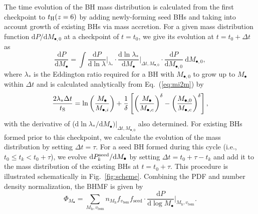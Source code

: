\documentclass[twocolumn, twocolappendix]{aastex63}
\newcommand{\Mh}{M_\mathrm{h}}
\newcommand{\Mbh}{M_\bullet}
\newcommand{\vbsm}{v_\mathrm{bsm}}
\newcommand{\tlife}{\tau}
\newcommand{\fseed}{f_\mathrm{seed}}
\newcommand{\D}{\mathrm{d}}
\begin{document}
\begin{CJK*}{UTF8}{gbsn}
The time evolution of the BH mass distribution is calculated from the first checkpoint to $t_{\rm H}(z=6)$ by adding newly-forming seed BHs
and taking into account growth of existing BHs via mass accretion.
For a given mass distribution function $\D P/\D  M_{\bullet, 0}$ at a checkpoint of $t=t_0$, 
we give its evolution at $t=t_0+\Delta t$ as
\begin{equation}
  \label{eq:dpdm}
  \frac{\D P}{\D \Mbh} = \int
   \frac{\D P}{\D \ln \lambda}\Big|_{\lambda_\ast} \cdot
   \frac{\D \ln \lambda_\ast}{\D  \Mbh}\Big|_{\Delta t, M_{\bullet,0}} \cdot
  \frac{\D P}{\D M_{\bullet, 0}}~\D M_{\bullet, 0},
\end{equation}
%
where $\lambda_\ast$ is the Eddington ratio required for a BH with $M_{\bullet,0}$ to grow up to $\Mbh$ within $\Delta t$
and is calculated analytically from Eq.~(\ref{eq:mi2m}) by
\begin{equation}
  \label{eq:mi2m}
\frac{2 \lambda_\ast \Delta t}{t_{\rm S}}=
  \ln \left(\frac{\Mbh} {M_{\bullet,i}}\right) + \frac{1}{\delta} 
  \left[ \left(\frac{\Mbh}{M_{\bullet,c}}\right)^\delta - \left(\frac{M_{\bullet, 0}}{M_{\bullet,c}}\right)^\delta \right],
\end{equation}
%
with the derivative of ($\D \ln \lambda_\ast / \D  \Mbh )|_{\Delta t, M_{\bullet,0}}$ also determined.
For existing BHs formed prior to this checkpoint, we calculate the evolution of the mass distribution by setting $\Delta t = \tlife$.
For a seed BH formed during this cycle (i.e., $t_0\leq t_k < t_0+\tlife$), 
we evolve $\D P^{\rm seed}_k/\D \Mbh$ by setting $\Delta t = t_0+\tlife -t_k$ and add it to the mass distribution 
of the existing BHs at $t=t_0+\tlife$.
This procedure is illustrated schematically in Fig.~\ref{fig:scheme}. 
Combining the PDF and number density normalization, the BHMF is given by
%
\begin{equation}
  \Phi_{\Mbh} 
  =\sum_{\Mh, \vbsm} n_{\Mh} f_{\vbsm} {\fseed} \cdot \frac{\D P}{\D \log \Mbh}\Big|_{\Mh, \vbsm}.
 \end{equation}



\end{CJK*}
\end{document}
